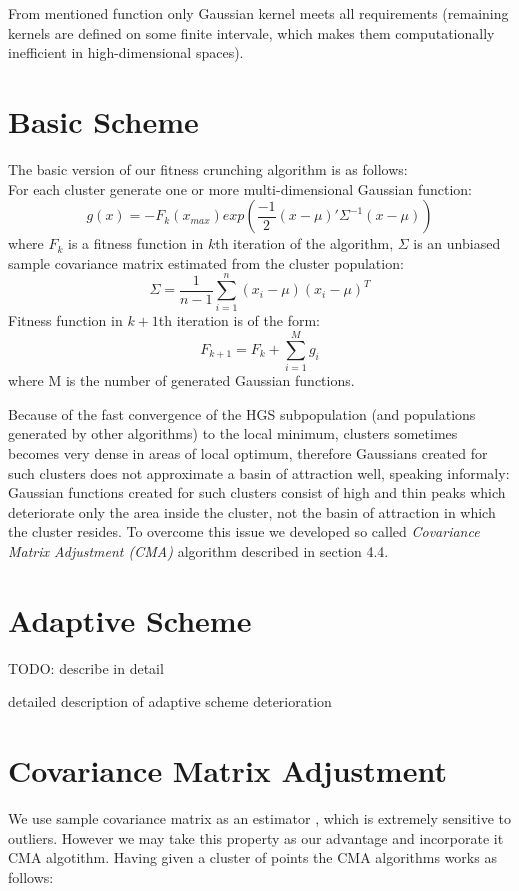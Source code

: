 From mentioned function only Gaussian kernel meets all requirements (remaining
kernels are defined on some finite intervale, which makes them computationally
inefficient in high-dimensional spaces).

\section{Basic Scheme}
The basic version of our fitness crunching algorithm is as follows: \\
For each cluster generate one or more multi-dimensional Gaussian function:
\begin{equation}
 g(x)= - F_k(x_{max}) exp(\frac{-1}{2}(x-\mu)'\Sigma^{-1}(x - \mu))
\end{equation}
where $F_k$ is a fitness function in $k$th iteration of the algorithm,
$\Sigma$ is an unbiased sample covariance matrix \cite{covariance} estimated
from the cluster population:
\begin{equation}
 \Sigma = \frac{1}{n-1}\sum_{i=1}^n(x_i - \mu)(x_i - \mu)^T
\end{equation}
Fitness function in $k+1$th iteration is of the form:
\begin{equation}
 F_{k+1}=F_k + \sum_{i=1}^M g_i
\end{equation}
where M is the number of generated Gaussian functions.

Because of the fast convergence of the HGS subpopulation (and populations
generated by other algorithms) to the local minimum, clusters sometimes becomes
very dense in areas of local optimum, therefore Gaussians created for such
clusters does not approximate a basin of attraction well, speaking informaly:
Gaussian functions created for such clusters consist of high and thin peaks
which deteriorate only the area inside the cluster, not the basin of attraction
in which the cluster resides.
To overcome this issue we developed so called \textit{Covariance Matrix
Adjustment (CMA)} algorithm described in section 4.4.


\section{Adaptive Scheme}
TODO: describe in detail

detailed description of adaptive scheme deterioration

\section{Covariance Matrix Adjustment}
We use sample covariance matrix as an estimator \cite{covariance}, which is 
extremely sensitive to outliers. However we may take this property as our
advantage and incorporate it CMA algotithm. 
Having given a cluster of points the CMA algorithms works as follows:



